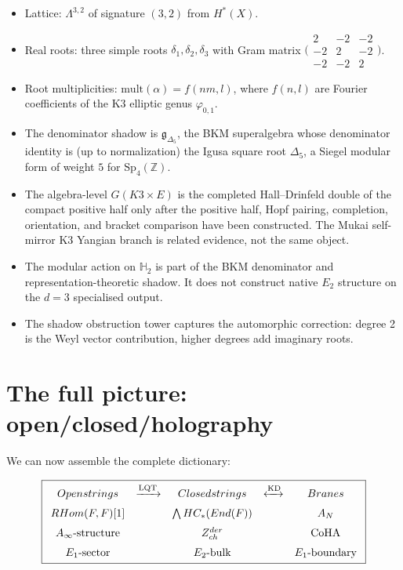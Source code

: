 \documentclass[11pt]{article}
\theoremstyle{definition}
\theoremstyle{remark}
\newcommand{\RHom}{\mathrm{RHom}}
\newcommand{\End}{\mathrm{End}}
\newcommand{\HC}{\mathrm{HC}}
\newcommand{\Ainf}{A_\infty}
\newcommand{\cA}{\mathcal{A}}
\newcommand{\cF}{\mathcal{F}}
\newcommand{\frakg}{\mathfrak{g}}
\newcommand{\Etwo}{E_2}
\begin{document}
\begin{itemize}
 \item Lattice: $\Lambda^{3,2}$ of signature $(3,2)$ from $H^*(X)$.
 \item Real roots: three simple roots $\delta_1, \delta_2, \delta_3$ with Gram
 matrix
 $\bigl(\begin{smallmatrix} 2 & -2 & -2 \\ -2 & 2 & -2 \\ -2 & -2 & 2
 \end{smallmatrix}\bigr)$.
 \item Root multiplicities: $\mathrm{mult}(\alpha) = f(nm, l)$, where
 $f(n, l)$ are Fourier coefficients of the K3 elliptic genus
 $\varphi_{0,1}$.
 \item The denominator shadow is $\frakg_{\Delta_5}$, the BKM superalgebra whose denominator
 identity is (up to normalization) the Igusa square root $\Delta_5$, a Siegel
 modular form of weight $5$ for $\mathrm{Sp}_4(\mathbb{Z})$.
 \item The algebra-level $G(K3\times E)$ is the completed Hall--Drinfeld double of the compact positive half only after the positive half, Hopf pairing, completion, orientation, and bracket comparison have been constructed. The Mukai self-mirror K3 Yangian branch is related evidence, not the same object.
 \item The modular action on $\mathbb{H}_2$ is part of the BKM denominator and representation-theoretic shadow. It does not construct native $\Etwo$ structure on the $d=3$ specialised output.
 \item The shadow obstruction tower captures the automorphic correction: degree 2 is the
 Weyl vector contribution, higher degrees add imaginary roots.
\end{itemize}


\section{The full picture: open/closed/holography}
\label{sec:full-picture}

We can now assemble the complete dictionary:

\[
\boxed{
\begin{array}{ccccc}
 \textbf{Open strings} & \xrightarrow{\text{LQT}} &
 \textbf{Closed strings} & \xleftrightarrow{\text{KD}} &
 \textbf{Branes} \\[6pt]
 \RHom(\cF, \cF)[1] & &
 \bigwedge \HC_*(\End(\cF)) & &
 \cA_N \\[6pt]
 \Ainf\text{-structure} & &
 Z^{\mathrm{der}}_{\mathrm{ch}} & &
 \text{CoHA} \\[6pt]
 E_1\text{-sector} & &
 E_2\text{-bulk} & &
 E_1\text{-boundary}
\end{array}
}
\]
\end{document}
